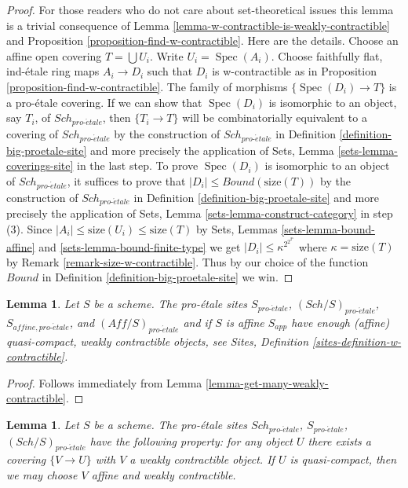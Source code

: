 \documentclass{stacks-project}
\theoremstyle{plain}
\newtheorem{lemma}[subsection]{Lemma}
\theoremstyle{definition}
\theoremstyle{remark}
\numberwithin{equation}{subsection}
\def\Spec{\mathop{\mathrm{Spec}}}
\def\Sch{\mathit{Sch}}
\def\proetale{{pro\text{-}\acute{e}tale}}
\begin{document}
\begin{proof}
For those readers who do not care about set-theoretical issues
this lemma is a trivial consequence of
Lemma \ref{lemma-w-contractible-is-weakly-contractible} and
Proposition \ref{proposition-find-w-contractible}.
Here are the details.
Choose an affine open covering $T = \bigcup U_i$. Write $U_i = \Spec(A_i)$.
Choose faithfully flat, ind-\'etale ring maps $A_i \to D_i$
such that $D_i$ is w-contractible as in
Proposition \ref{proposition-find-w-contractible}.
The family of morphisms $\{\Spec(D_i) \to T\}$ is a
pro-\'etale covering.
If we can show that $\Spec(D_i)$ is isomorphic to an object, say $T_i$,
of $\Sch_\proetale$, then $\{T_i \to T\}$ will be combinatorially
equivalent to a covering of $\Sch_\proetale$ by the construction
of $\Sch_\proetale$ in Definition \ref{definition-big-proetale-site}
and more precisely the application of
Sets, Lemma \ref{sets-lemma-coverings-site} in the last step.
To prove $\Spec(D_i)$ is isomorphic to an object of
$\Sch_\proetale$, it suffices to prove that
$|D_i| \leq Bound(\text{size}(T))$ by the construction
of $\Sch_\proetale$ in Definition \ref{definition-big-proetale-site}
and more precisely the application of
Sets, Lemma \ref{sets-lemma-construct-category} in step (3).
Since $|A_i| \leq \text{size}(U_i) \leq \text{size}(T)$
by Sets, Lemmas \ref{sets-lemma-bound-affine} and
\ref{sets-lemma-bound-finite-type} we get
$|D_i| \leq \kappa^{2^{2^{2^\kappa}}}$ where $\kappa = \text{size}(T)$
by Remark \ref{remark-size-w-contractible}.
Thus by our choice of the function $Bound$ in
Definition \ref{definition-big-proetale-site} we win.
\end{proof}

\begin{lemma}
\label{lemma-proetale-enough-w-contractible}
Let $S$ be a scheme. The pro-\'etale sites
$S_\proetale$, $(\Sch/S)_\proetale$, $S_{affine, \proetale}$, and
$(\textit{Aff}/S)_\proetale$ and if $S$ is affine $S_{app}$
have enough (affine) quasi-compact, weakly contractible
objects, see Sites, Definition \ref{sites-definition-w-contractible}.
\end{lemma}

\begin{proof}
Follows immediately from Lemma \ref{lemma-get-many-weakly-contractible}.
\end{proof}

\begin{lemma}
\label{lemma-weakly-contractible-cover}
Let $S$ be a scheme. The pro-\'etale sites
$\Sch_\proetale$, $S_\proetale$, $(\Sch/S)_\proetale$
have the following property: for any object
$U$ there exists a covering $\{V \to U\}$ with $V$ a
weakly contractible object. If $U$ is quasi-compact, then we
may choose $V$ affine and weakly contractible.
\end{lemma}
\end{document}
